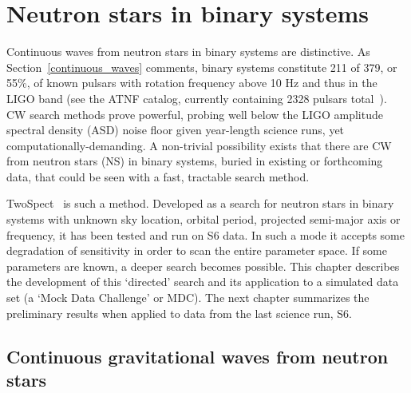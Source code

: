 


        
        \section{Neutron stars in binary systems}
        \label{binary_NS}

Continuous waves from neutron stars in binary systems are distinctive.
As Section~\ref{continuous_waves} comments, binary systems constitute 211 of 379, or 55\%, of known pulsars with rotation frequency above 10 Hz and thus in the LIGO band (see the ATNF catalog, currently containing 2328 pulsars total~\cite{ManchesterATNF2005}).
CW search methods prove powerful, probing well below the LIGO amplitude spectral density (ASD) noise floor given year-length science runs, yet computationally-demanding.
A non-trivial possibility exists that there are CW from neutron stars (NS) in binary systems, buried in existing or forthcoming data, that could be seen with a fast, tractable search method.

TwoSpect~\cite{GoetzThesis,GoetzTwoSpectMethods2011,GoetzTwoSpectResults2014} is such a method. 
Developed as a search for neutron stars in binary systems with unknown sky location, orbital period, projected semi-major axis or frequency, it has been tested and run on S6 data.
In such a mode it accepts some degradation of sensitivity in order to scan the entire parameter space.
If some parameters are known, a deeper search becomes possible.
This chapter describes the development of this `directed' search and its application to a simulated data set (a `Mock Data Challenge' or MDC).
The next chapter summarizes the preliminary results when applied to data from the last science run, S6.


\subsection{Continuous gravitational waves from neutron stars}


